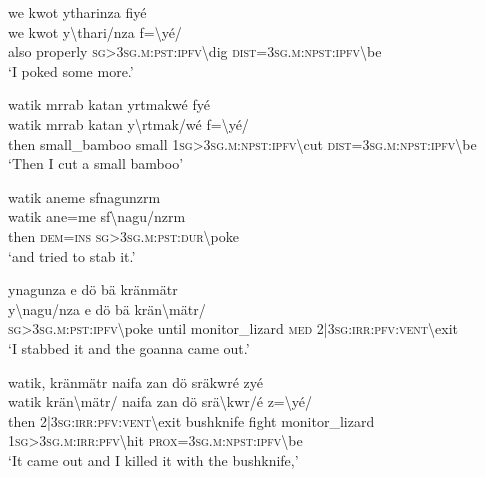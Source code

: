\ea\label{ex:13:a1318}
we kwot ytharinza fiyé\\
\gll we	kwot	y{\textbackslash}thari/nza	f={\textbackslash}yé/\\
     also	properly	\textsc{sg}>3\textsc{sg}.\textsc{m}:\textsc{pst}:\textsc{ipfv}{\textbackslash}dig	\textsc{dist}=3\textsc{sg}.\textsc{m}:\textsc{npst}:\textsc{ipfv}{\textbackslash}be\\
\glt `I poked some more.'
\z

\ea\label{ex:13:a1319}
watik mrrab katan yrtmakwé fyé\\
\gll watik	mrrab	katan	y{\textbackslash}rtmak/wé	f={\textbackslash}yé/\\
     then	small\_bamboo	small	1\textsc{sg}>3\textsc{sg}.\textsc{m}:\textsc{npst}:\textsc{ipfv}{\textbackslash}cut	\textsc{dist}=3\textsc{sg}.\textsc{m}:\textsc{npst}:\textsc{ipfv}{\textbackslash}be\\
\glt `Then I cut a small bamboo'
\z

\ea\label{ex:13:a1320}
watik aneme sfnagunzrm\\
\gll watik	ane=me	sf{\textbackslash}nagu/nzrm\\
     then	\textsc{dem}=\textsc{ins}	\textsc{sg}>3\textsc{sg}.\textsc{m}:\textsc{pst}:\textsc{dur}{\textbackslash}poke\\
\glt `and tried to stab it.'
\z

\ea\label{ex:13:a1321}
ynagunza e dö bä kränmätr\\
\gll y{\textbackslash}nagu/nza	e	dö	bä	krän{\textbackslash}mätr/\\
     \textsc{sg}>3\textsc{sg}.\textsc{m}:\textsc{pst}:\textsc{ipfv}{\textbackslash}poke	until	monitor\_lizard	\textsc{med}	2|3\textsc{sg}:\textsc{irr}:\textsc{pfv}:\textsc{vent}{\textbackslash}exit\\
\glt `I stabbed it and the goanna came out.'
\z

\ea\label{ex:13:a1322}
watik, kränmätr naifa zan dö sräkwré zyé\\
\gll watik	krän{\textbackslash}mätr/	naifa	zan	dö	srä{\textbackslash}kwr/é	z={\textbackslash}yé/\\
     then	2|3\textsc{sg}:\textsc{irr}:\textsc{pfv}:\textsc{vent}{\textbackslash}exit	bushknife	fight	monitor\_lizard	1\textsc{sg}>3\textsc{sg}.\textsc{m}:\textsc{irr}:\textsc{pfv}{\textbackslash}hit	\textsc{prox}=3\textsc{sg}.\textsc{m}:\textsc{npst}:\textsc{ipfv}{\textbackslash}be\\
\glt `It came out and I killed it with the bushknife,'
\z

